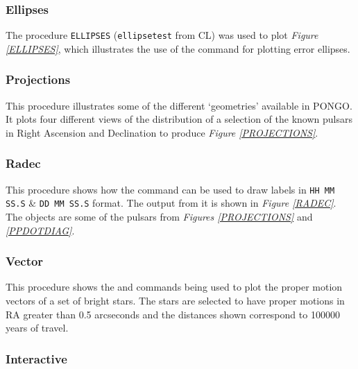 \newpage


\subsubsection{Ellipses}

The procedure \verb+ELLIPSES+ (\verb+ellipsetest+ from CL) was used to plot
{\em Figure \ref{ELLIPSES}}, which illustrates the use of the
 command for plotting error ellipses.

\newpage


\subsubsection{Projections}

This procedure illustrates some of the different `geometries'
available in PONGO.  It plots four different views of the distribution
of a selection of the known pulsars in Right Ascension and Declination
to produce {\em Figure \ref{PROJECTIONS}}.

\newpage

\subsubsection{Radec}

This procedure shows how the  command can be
used to draw labels in \verb+HH MM SS.S+ \& \verb+DD MM SS.S+
format.
The output from it is shown in {\em Figure \ref{RADEC}}.
The objects are some of the pulsars from
{\em Figures \ref{PROJECTIONS}} and {\em \ref{PPDOTDIAG}}.
\newpage

\subsubsection{Vector}
This procedure shows the  and 
commands being used to plot the proper motion vectors of a set of
bright stars. The stars are selected to have proper motions in
RA greater than 0.5 arcseconds and the distances shown correspond to
100000 years of travel.

\newpage

\subsubsection{Interactive}

